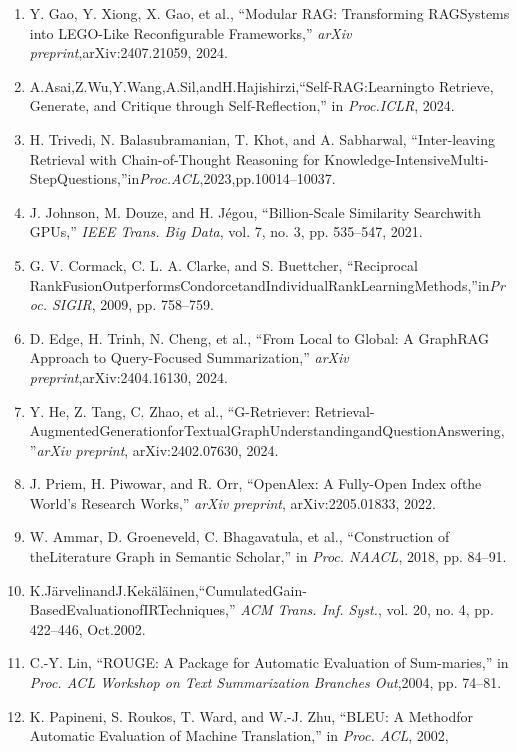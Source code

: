 \documentclass[
]{article}
\begin{document}
\begin{enumerate}
\def\labelenumi{\arabic{enumi}.}
\setcounter{enumi}{40}
\item
  Y. Gao, Y. Xiong, X. Gao, et al., ``Modular RAG: Transforming RAGSystems into LEGO-Like Reconfigurable Frameworks,'' \emph{arXiv preprint},\protect{}\label{_bookmark50}{}arXiv:2407.21059, 2024.
\item
  A.Asai,Z.Wu,Y.Wang,A.Sil,andH.Hajishirzi,``Self-RAG:Learningto Retrieve, Generate, and Critique through Self-Reflection,'' in \emph{Proc.}\protect{}\label{_bookmark51}{}\emph{ICLR}, 2024.
\item
  H. Trivedi, N. Balasubramanian, T. Khot, and A. Sabharwal, ``Inter-leaving Retrieval with Chain-of-Thought Reasoning for Knowledge-\protect{}\label{_bookmark52}{}IntensiveMulti-StepQuestions,''in\emph{Proc.ACL},2023,pp.10014--10037.
\item
  J. Johnson, M. Douze, and H. Jégou, ``Billion-Scale Similarity Search\protect{}\label{_bookmark53}{}with GPUs,'' \emph{IEEE Trans. Big Data}, vol. 7, no. 3, pp. 535--547, 2021.
\item
  G. V. Cormack, C. L. A. Clarke, and S. Buettcher, ``Reciprocal RankFusionOutperformsCondorcetandIndividualRankLearningMethods,''\protect{}\label{_bookmark54}{}in\emph{Proc. SIGIR}, 2009, pp. 758--759.
\item
  D. Edge, H. Trinh, N. Cheng, et al., ``From Local to Global: A GraphRAG Approach to Query-Focused Summarization,'' \emph{arXiv preprint},\protect{}\label{_bookmark55}{}arXiv:2404.16130, 2024.
\item
  Y. He, Z. Tang, C. Zhao, et al., ``G-Retriever: Retrieval-AugmentedGenerationforTextualGraphUnderstandingandQuestionAnswering,''\protect{}\label{_bookmark56}{}\emph{arXiv preprint}, arXiv:2402.07630, 2024.
\item
  J. Priem, H. Piwowar, and R. Orr, ``OpenAlex: A Fully-Open Index of\protect{}\label{_bookmark57}{}the World's Research Works,'' \emph{arXiv preprint}, arXiv:2205.01833, 2022.
\item
  W. Ammar, D. Groeneveld, C. Bhagavatula, et al., ``Construction of theLiterature Graph in Semantic Scholar,'' in \emph{Proc. NAACL}, 2018, pp. 84--\protect{}\label{_bookmark58}{}91.
\item
  K.JärvelinandJ.Kekäläinen,``CumulatedGain-BasedEvaluationofIRTechniques,'' \emph{ACM Trans. Inf. Syst.}, vol. 20, no. 4, pp. 422--446, Oct.\protect{}\label{_bookmark59}{}2002.
\item
  C.-Y. Lin, ``ROUGE: A Package for Automatic Evaluation of Sum-maries,'' in \emph{Proc. ACL Workshop on Text Summarization Branches Out},2004, pp. 74--81.
\item
  \protect{}\label{_bookmark60}{}K. Papineni, S. Roukos, T. Ward, and W.-J. Zhu, ``BLEU: A Methodfor Automatic Evaluation of Machine Translation,'' in \emph{Proc. ACL}, 2002,
\end{enumerate}
\end{document}
